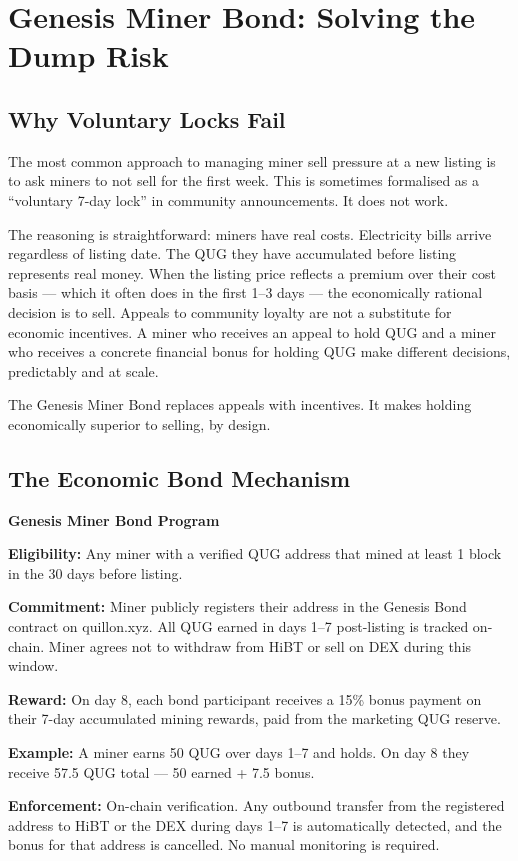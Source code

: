 \documentclass[11pt,a4paper]{article}
\begin{document}
\section{Genesis Miner Bond: Solving the Dump Risk}
\label{sec:bond}

\subsection{Why Voluntary Locks Fail}

The most common approach to managing miner sell pressure at a new listing is to ask miners to not sell for the first week. This is sometimes formalised as a ``voluntary 7-day lock'' in community announcements. It does not work.

The reasoning is straightforward: miners have real costs. Electricity bills arrive regardless of listing date. The QUG they have accumulated before listing represents real money. When the listing price reflects a premium over their cost basis — which it often does in the first 1--3 days — the economically rational decision is to sell. Appeals to community loyalty are not a substitute for economic incentives. A miner who receives an appeal to hold QUG and a miner who receives a concrete financial bonus for holding QUG make different decisions, predictably and at scale.

The Genesis Miner Bond replaces appeals with incentives. It makes holding economically superior to selling, by design.

\subsection{The Economic Bond Mechanism}

\begin{tcolorbox}[goldbox]
\textbf{Genesis Miner Bond Program}

\medskip
\textbf{Eligibility:} Any miner with a verified QUG address that mined at least 1 block in the 30 days before listing.

\textbf{Commitment:} Miner publicly registers their address in the Genesis Bond contract on quillon.xyz. All QUG earned in days 1--7 post-listing is tracked on-chain. Miner agrees not to withdraw from HiBT or sell on DEX during this window.

\textbf{Reward:} On day 8, each bond participant receives a 15\% bonus payment on their 7-day accumulated mining rewards, paid from the marketing QUG reserve.

\textbf{Example:} A miner earns 50 QUG over days 1--7 and holds. On day 8 they receive 57.5 QUG total — 50 earned + 7.5 bonus.

\textbf{Enforcement:} On-chain verification. Any outbound transfer from the registered address to HiBT or the DEX during days 1--7 is automatically detected, and the bonus for that address is cancelled. No manual monitoring is required.
\end{tcolorbox}
\end{document}
